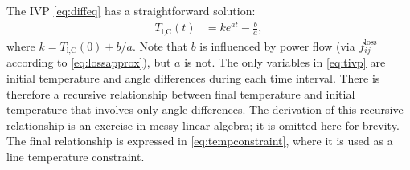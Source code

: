 \documentclass[journal,twoside]{IEEEtran}
\begin{document}
The IVP \eqref{eq:diffeq} has a straightforward solution:
\begin{align}\label{eq:tivp}
T_\text{l,C}(t) &= ke^{at} - \frac{b}{a},
\end{align}
where $k=T_\text{l,C}(0) + b/a$. Note that $b$ is influenced by power flow (via
$f_{ij}^\text{loss}$ according to \eqref{eq:lossapprox}), but $a$ is not. The only variables in \eqref{eq:tivp} are initial temperature and angle differences during each time interval. There is therefore a recursive relationship between final temperature and initial temperature that involves only angle differences. The derivation of this recursive relationship is an exercise in messy linear algebra; it is omitted here for brevity. The final relationship is expressed in \eqref{eq:tempconstraint}, where it is used as a line temperature constraint.

\end{document}
